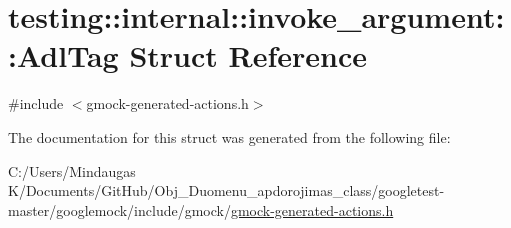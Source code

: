 \hypertarget{structtesting_1_1internal_1_1invoke__argument_1_1_adl_tag}{}\section{testing\+::internal\+::invoke\+\_\+argument\+::Adl\+Tag Struct Reference}
\label{structtesting_1_1internal_1_1invoke__argument_1_1_adl_tag}


{\ttfamily \#include $<$gmock-\/generated-\/actions.\+h$>$}



The documentation for this struct was generated from the following file\+:\begin{DoxyCompactItemize}
\item 
C\+:/\+Users/\+Mindaugas K/\+Documents/\+Git\+Hub/\+Obj\+\_\+\+Duomenu\+\_\+apdorojimas\+\_\+class/googletest-\/master/googlemock/include/gmock/\mbox{\hyperlink{googletest-master_2googlemock_2include_2gmock_2gmock-generated-actions_8h}{gmock-\/generated-\/actions.\+h}}\end{DoxyCompactItemize}
